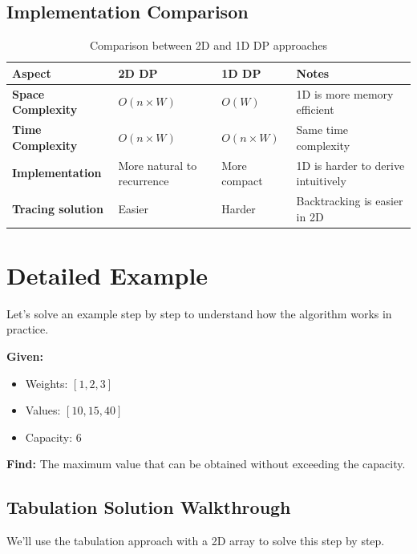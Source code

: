 \documentclass{article}
\begin{document}
\subsection{Implementation Comparison}

\begin{table}[h]
\centering
\begin{tabular}{|p{3cm}|p{4cm}|p{4cm}|p{4cm}|}
\hline
\rowcolor{gray!20}
\textbf{Aspect} & \textbf{2D DP} & \textbf{1D DP} & \textbf{Notes} \\
\hline
\textbf{Space Complexity} & $O(n \times W)$ & $O(W)$ & 1D is more memory efficient \\
\hline
\textbf{Time Complexity} & $O(n \times W)$ & $O(n \times W)$ & Same time complexity \\
\hline
\textbf{Implementation} & More natural to recurrence & More compact & 1D is harder to derive intuitively \\
\hline
\textbf{Tracing solution} & Easier & Harder & Backtracking is easier in 2D \\
\hline
\end{tabular}
\caption{Comparison between 2D and 1D DP approaches}
\end{table}

\section{Detailed Example}

Let's solve an example step by step to understand how the algorithm works in practice.

\begin{tcolorbox}[examplebox, title=Example Problem]
\textbf{Given:}
\begin{itemize}
    \item Weights: $[1, 2, 3]$
    \item Values: $[10, 15, 40]$
    \item Capacity: $6$
\end{itemize}
\textbf{Find:} The maximum value that can be obtained without exceeding the capacity.
\end{tcolorbox}

\subsection{Tabulation Solution Walkthrough}

We'll use the tabulation approach with a 2D array to solve this step by step.
\end{document}
